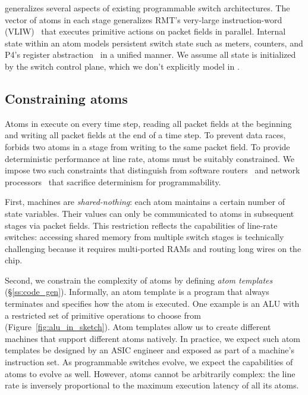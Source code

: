 
\absmachine generalizes several aspects of existing programmable switch
architectures. The vector of atoms in each stage generalizes RMT's very-large
instruction-word (VLIW)~\cite{rmt} that executes primitive actions on packet
fields in parallel. Internal state within an atom models persistent switch
state such as meters, counters, and P4's register abstraction~\cite{p4spec} in
a unified manner. We assume all state is initialized by the switch control
plane, which we don't explicitly model in \absmachine.

\subsection{Constraining atoms}
\label{s:atomConstraints}


Atoms in \absmachine execute on every time step, reading all packet fields at
the beginning and writing all packet fields at the end of a time step. To
prevent data races, \absmachine forbids two atoms in a stage from writing to
the same packet field.  To provide deterministic performance at line rate,
atoms must be suitably constrained.  We impose two such constraints that
distinguish \absmachine from software routers~\cite{click} and network
processors~\cite{ixp4xx} that sacrifice determinism for programmability.

First, \absmachine machines are \textit{shared-nothing}: each atom maintains a
certain number of state variables.  Their values can only be communicated to
atoms in subsequent stages via packet fields. This restriction reflects the
capabilities of line-rate switches: accessing shared memory from multiple
switch stages is technically challenging because it requires multi-ported RAMs
and routing long wires on the chip.

Second, we constrain the complexity of atoms by defining {\it atom templates}
(\S\ref{ss:code_gen}).  Informally, an atom template is a program that always
terminates and specifies how the atom is executed. One example is an ALU with a
restricted set of primitive operations to choose from
(Figure~\ref{fig:alu_in_sketch}). Atom templates allow us to create different
\absmachine machines that support different atoms natively. In practice, we
expect such atom templates be designed by an ASIC engineer and exposed as part
of a \absmachine machine's instruction set. As programmable switches evolve, we
expect the capabilities of atoms to evolve as well. However, atoms cannot be
arbitrarily complex: the line rate is inversely proportional to the maximum
execution latency of all its atoms.
